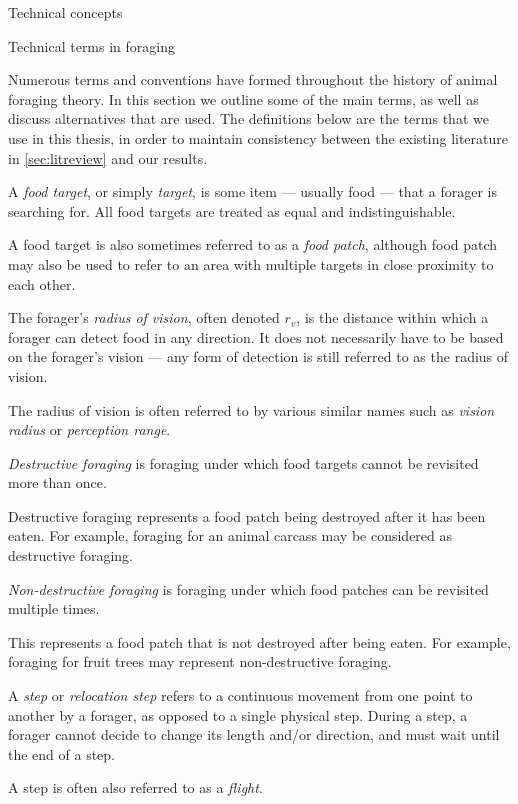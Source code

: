 \begin{section}{Technical concepts \label{sec:tc}}
\begin{subsection}{Technical terms in foraging \label{sec:foraging_terms}}
	
Numerous terms and conventions have formed throughout the history of animal foraging theory. In this section we outline some of the main terms, as well as discuss alternatives that are used. The definitions below are the terms that we use in this thesis, in order to maintain consistency between the existing literature in \cref{sec:litreview} and our results. 
	
	\begin{definition}
		\label{def:food_target}
		A \emph{food target}, or simply \emph{target}, is some item --- usually food --- that a forager is searching for. All food targets are treated as equal and indistinguishable. 
		\end{definition}
	A food target is also sometimes referred to as a \emph{food patch}, although food patch may also be used to refer to an area with multiple targets in close proximity to each other.
	
	\begin{definition}
		The forager's \emph{radius of vision}, often denoted $r_v$, is the distance within which a forager can detect food in any direction. It does not necessarily have to be based on the forager's vision --- any form of detection is still referred to as the radius of vision.
	\end{definition}
	The radius of vision is often referred to by various similar names such as \emph{vision radius} or \emph{perception range}.
	
	\begin{definition}
		\emph{Destructive foraging} is foraging under which food targets cannot be revisited more than once.
	\end{definition}
	Destructive foraging represents a food patch being destroyed after it has been eaten. For example, foraging for an animal carcass may be considered as destructive foraging.
	\begin{definition}
	\emph{Non-destructive foraging} is foraging under which food patches can be revisited multiple times. 
	\end{definition}
	This represents a food patch that is not destroyed after being eaten. For example, foraging for fruit trees may represent non-destructive foraging.
	
	\begin{definition}
		A \emph{step} or \emph{relocation step} refers to a continuous movement from one point to another by a forager, as opposed to a single physical step. During a step, a forager cannot decide to change its length and/or direction, and must wait until the end of a step. 
	\end{definition}
	A step is often also referred to as a \emph{flight}.
	

\end{subsection}
\end{section}
